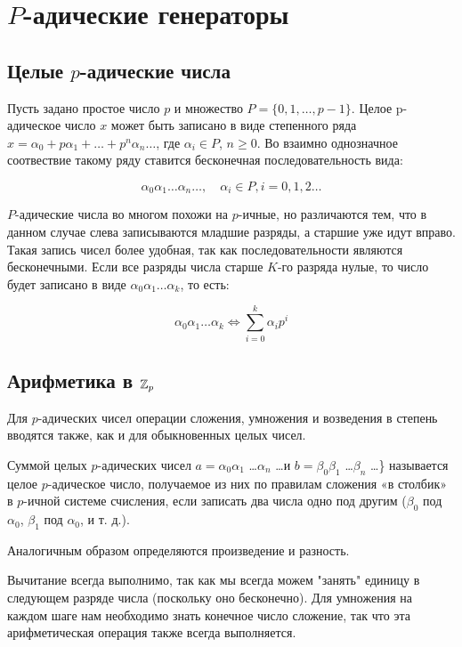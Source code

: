 \chapter{$P$-адические генераторы} \label{chapt1}

\section{Целые $p$-адические числа} \label{sect1_1}

Пусть задано простое число $p$ и множество $P=\{0,1,\ldots , p-1\}$. Целое p-адическое число $x$ может быть записано в виде степенного ряда $x=\alpha_0+p\alpha_1+\ldots+p^n\alpha_n\ldots$, где $\alpha_i\in P$, $n\geq0$. Во взаимно однозначное соотвествие такому ряду ставится бесконечная последовательность вида: 

$$\alpha_0 \alpha_1 \ldots \alpha_n \ldots, \quad \alpha_i \in P, i = 0,1,2 \ldots$$


$P$-адические числа во многом похожи  на $p$-ичные, но различаются тем, что в данном случае слева записываются младшие разряды, а старшие уже идут вправо. Такая запись чисел более удобная, так как последовательности являются бесконечными. Если все разряды числа старше $K$-го разряда нулые, то число будет записано в виде  $\alpha_0 \alpha_1 \ldots \alpha_k$, то есть:

\begin{equation}
   \alpha_0 \alpha_1 \ldots \alpha_k \Leftrightarrow \sum_{i=0}^k \alpha_i p^i
\end{equation}


\section{Арифметика в $\mathbb{Z}_p$} \label{sect1_2}

Для $p$-адических чисел  операции сложения, умножения и возведения в степень вводятся также, как и для обыкновенных целых чисел.

Суммой целых $p$-адических чисел $a = \alpha_0 \alpha_1$ \ldots $\alpha_n$ \ldots и $b = \beta_0 \beta_1$ \ldots $\beta_n$ \ldots\} называется целое $p$-адическое число, получаемое из них по правилам сложения «в столбик» в $p$-ичной системе счисления, если записать два числа одно под другим ($\beta_0$ под $\alpha_0$, $\beta_1$ под $\alpha_0$,
и т. д.).

Аналогичным образом определяются произведение и разность.

Вычитание всегда выполнимо, так как мы всегда можем "занять" единицу в следующем разряде числа (поскольку оно бесконечно). Для умножения на каждом шаге нам необходимо знать конечное число сложение, так что эта арифметическая операция также всегда выполняется. 

